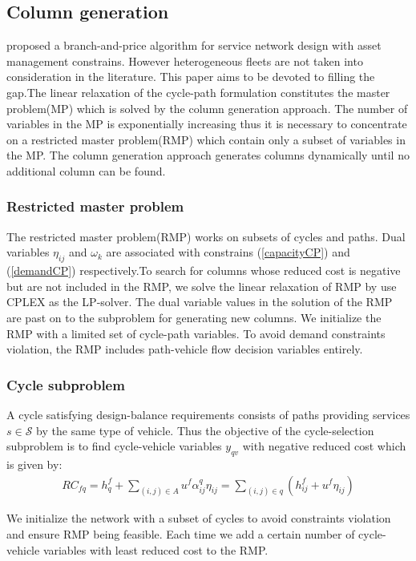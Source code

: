 \documentclass[11pt,nonblindrev,fleqn]{article}
\begin{document}
\subsection{Column generation}
\cite{Andersen2011Branch} proposed a branch-and-price algorithm for service network design with asset management constrains. However heterogeneous fleets are not taken into consideration in the literature. This paper aims to be devoted to filling the gap.The linear relaxation of the cycle-path formulation constitutes the master problem(MP) which is solved by the column generation approach. The number of variables in the MP is exponentially increasing thus it is necessary to concentrate on a restricted master problem(RMP) which contain only a subset of variables in the MP. The column generation approach generates columns dynamically until no additional column can be found.

\subsubsection{Restricted master problem}
The restricted master problem(RMP) works on subsets of cycles and paths. Dual variables $\eta_{ij}$ and $\omega_k$ are associated with constrains (\ref{capacityCP}) and (\ref{demandCP}) respectively.To search for columns whose reduced cost is negative but are not included in the RMP, we solve the linear relaxation of RMP by use CPLEX as the LP-solver. The dual variable values in the solution of the RMP are past on to the subproblem for generating new columns. We initialize the RMP with a limited set of cycle-path variables. To avoid demand constraints violation, the RMP includes path-vehicle flow decision variables entirely.
\subsubsection{Cycle subproblem}
A cycle satisfying design-balance requirements consists of paths providing services $s\in \mathscr{S}$ by the same type of vehicle. Thus the objective of the cycle-selection subproblem is to find cycle-vehicle variables $y_{qv}$ with negative reduced cost which is given by:
\begin{align}
RC_{fq} = h_q^f + \sum_{(i,j)\in A} u^f \alpha_{ij}^q \eta_{ij} = \sum_{(i,j)\in q} (h_{ij}^f + u^f \eta_{ij})
\end{align}

We initialize the network with a subset of cycles to avoid constraints violation and ensure RMP being feasible. Each time we add a certain number of cycle-vehicle variables with least reduced cost to the RMP.
\end{document}
